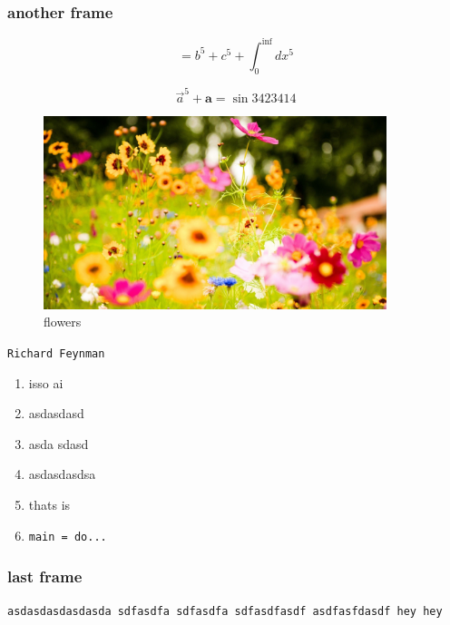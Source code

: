 \documentclass[12pt,a4paper]{article}
\begin{document}
\begin{frame}\frametitle{another frame}
\begin{equation}\label{a^5}
= b^5 + c^5 + \int^{\inf}_{0}dx^5
\end{equation} 

$$\vec{a}^5 + \mathbf{a} = \sin{3423414}$$

 \begin{figure}[H]
\centering
\includegraphics[width=10cm]{../../External/Images/flowers}
\caption{flowers}
\end{figure}
 

 {\tt Richard Feynman} 

 \begin{enumerate}
\item isso ai
\item asdasdasd
\item asda
sdasd
\item asdasdasdsa
\item thats is
\item \lstset{language=haskell}
\begin{lstlisting}[frame=none]
main = do...
\end{lstlisting}
\end{enumerate}
\end{frame}

\begin{frame}\frametitle{last frame}
{\tt asdasdasdasdasda
sdfasdfa
sdfasdfa
sdfasdfasdf
asdfasfdasdf hey hey}
\end{frame}
\end{document}
